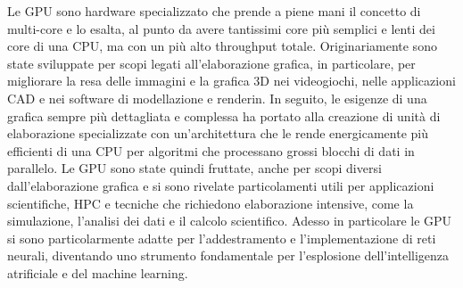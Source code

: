 
Le \gls{GPU} sono hardware specializzato che prende a piene mani il concetto di multi-core e lo esalta, al punto da avere tantissimi core più semplici e lenti dei core di una CPU, ma con un più alto throughput totale. 
Originariamente sono state sviluppate per scopi legati all'elaborazione grafica, in particolare, per migliorare la resa delle immagini e la grafica 3D nei videogiochi, nelle applicazioni \gls{CAD} e nei software di modellazione e renderin. In seguito, le esigenze di una grafica sempre più dettagliata e complessa ha portato alla creazione di unità di elaborazione specializzate con un'architettura che le rende energicamente più efficienti di una CPU per algoritmi che processano grossi blocchi di dati in parallelo. Le GPU sono state quindi fruttate, anche per scopi diversi dall'elaborazione grafica e si sono rivelate particolamenti utili per applicazioni scientifiche, \gls{HPC} e tecniche che richiedono elaborazione intensive, come la simulazione, l'analisi dei dati e il calcolo scientifico. Adesso in particolare le GPU si sono particolarmente adatte per l'addestramento e l'implementazione di reti neurali, diventando uno strumento fondamentale per l'esplosione dell'intelligenza atrificiale e del machine learning.


